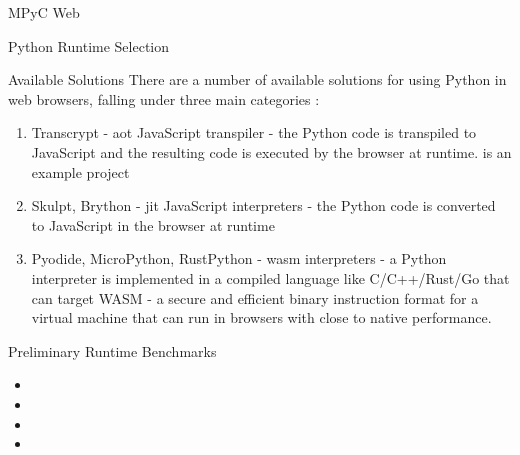 \begin{block}{MPyC Web}
\begin{block}{Python Runtime Selection}
\begin{block}{Available Solutions}
\label{thesis__090-mpyc-web.md__available-solutions}
There are a number of available solutions for using Python in web browsers, falling under three main categories\autocite{pyodideIntroMozilla} \autocite{anvilPythonBrowser}:

\begin{enumerate}
\tightlist
\item
  Transcrypt\autocite{transcryptRepo} - \gls{aot} JavaScript transpiler - the Python code is transpiled to JavaScript and the resulting code is executed by the browser at runtime. is an example project
\item
  Skulpt\autocite{skulptDocs}, Brython\autocite{brythonDocs} - \gls{jit} JavaScript interpreters - the Python code is converted to JavaScript in the browser at runtime
\item
  Pyodide\autocite{pyodideDocs}, MicroPython\autocite{microPythonDocs}, RustPython\autocite{rustPythonDocs} - \gls{wasm}\autocite{wasmDocs} interpreters - a Python interpreter is implemented in a compiled language like C/C++/Rust/Go that can target WASM - a secure and efficient binary instruction format for a virtual machine that can run in browsers with close to native performance.
\end{enumerate}
\end{block}

\begin{block}{Preliminary Runtime Benchmarks}
\label{thesis__090-mpyc-web.md__preliminary-runtime-benchmarks}
\begin{itemize}
\tightlist
\item
\item
\item
\item
\end{itemize}


\end{block}
\end{block}
\end{block}
